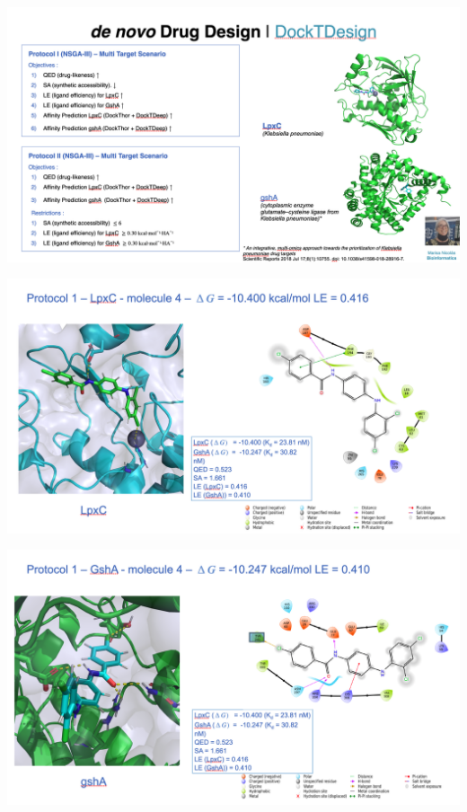 \documentclass[aspectratio=169,xcolor=dvipsnames]{beamer}
\begin{document}
\begin{frame}
    \includegraphics[width=1\textwidth]{imgs/extras-1.png}
\end{frame}


\begin{frame}
    \includegraphics[width=1\textwidth]{imgs/extras-2.png}
\end{frame}


\begin{frame}
    \includegraphics[width=1\textwidth]{imgs/extras-3.png}
\end{frame}
\end{document}
